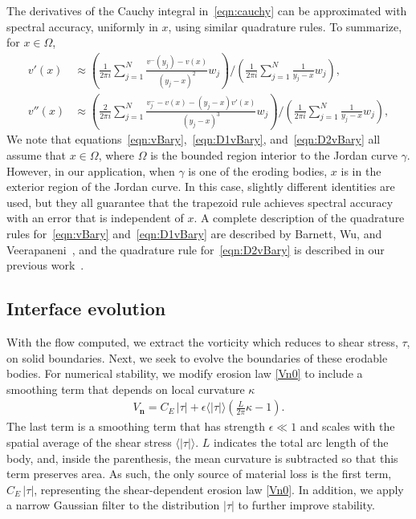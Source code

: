\documentclass[3p]{elsarticle}
\newcommand{\nn}{{\mathbf{n}}}
\newcommand{\abs}[1]{\left| #1 \right|}
\newcommand{\Vn}{V_\nn}
\newcommand{\CE}{C_E}
\begin{document}
The derivatives of the Cauchy integral in~\eqref{eqn:cauchy} can be
approximated with spectral accuracy, uniformly in $x$, using similar quadrature
rules. To summarize, for $x \in \Omega$, 
\begin{align}
  v'(x) &\approx \left(\frac{1}{2\pi i}\sum_{j=1}^{N}
    \frac{v^{-}(y_j) - v(x)}{(y_j-x)^2} w_j \right)
  \Bigg/
  \left(\frac{1}{2\pi i}\sum_{j=1}^{N} \frac{1}{y_j-x} w_j\right), 
  \label{eqn:D1vBary} \\
  v''(x) &\approx \left(\frac{2}{2\pi i}\sum_{j=1}^N 
    \frac{v^{-}_{j} - v(x) - (y_j-x)v'(x)}{(y_j-x)^3}w_j \right)
    \Bigg/
    \left(\frac{1}{2\pi i}\sum_{j=1}^N \frac{1}{y_j-x}w_j\right),
  \label{eqn:D2vBary}
\end{align}
We note that equations~\eqref{eqn:vBary},~\eqref{eqn:D1vBary},
and~\eqref{eqn:D2vBary} all assume that $x \in \Omega$, where $\Omega$
is the bounded region interior to the Jordan curve $\gamma$. However, in
our application, when $\gamma$ is one of the eroding bodies, $x$ is in
the exterior region of the Jordan curve. In this case, slightly
different identities are used, but they all guarantee that the trapezoid
rule achieves spectral accuracy with an error that is independent of
$x$. A complete description of the quadrature rules
for~\eqref{eqn:vBary} and~\eqref{eqn:D1vBary} are described by Barnett,
Wu, and Veerapaneni~\cite{bar-wu-vee2015}, and the quadrature rule
for~\eqref{eqn:D2vBary} is described in our previous
work~\cite{chiu2020viscous}.


\subsection{Interface evolution}

With the flow computed, we extract the vorticity which reduces to shear stress, $\tau$, on solid boundaries. Next, we seek to evolve the boundaries of these erodable bodies. For numerical stability, we modify erosion law \eqref{Vn0} to include a smoothing term that depends on local curvature $\kappa$~\cite{quaife2018boundary}
\begin{align}
  \Vn = \CE \, \abs{\tau} + \epsilon \langle\abs{\tau}\rangle \left(
    \frac{L}{2\pi} \kappa - 1 \right).
\end{align}
The last term is a smoothing term that has strength $\epsilon \ll 1$ and scales with the spatial average of the shear stress $\langle\abs{\tau}\rangle$. $L$ indicates the total arc length of the body, and, inside the parenthesis, the mean curvature is subtracted so that this term preserves area. As such, the only source of material loss is the first term, $\CE \, \abs{\tau}$, representing the shear-dependent erosion law \eqref{Vn0}. In addition, we apply a narrow Gaussian filter to the distribution $\abs{\tau}$ to further improve stability.
\end{document}
